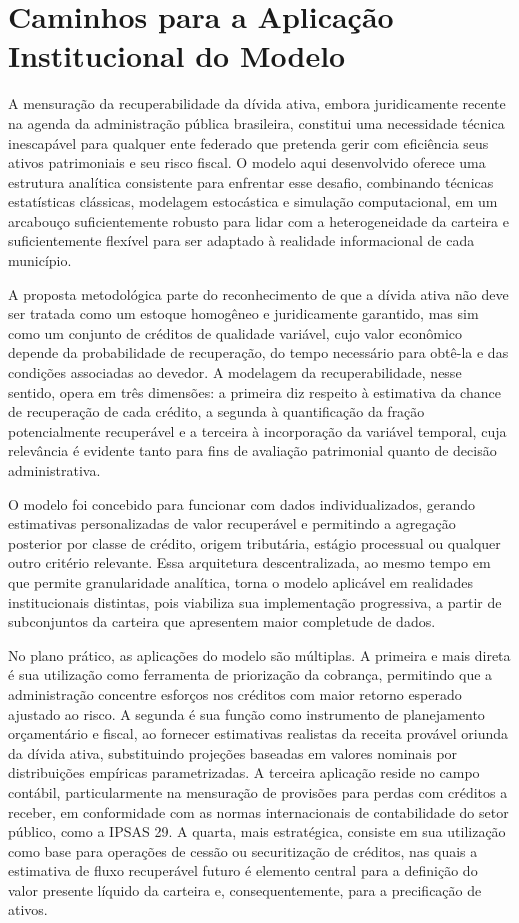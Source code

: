 \documentclass[a4paper,12pt]{article}
\begin{document}
\section{Caminhos para a Aplicação Institucional do Modelo}
A mensuração da recuperabilidade da dívida ativa, embora juridicamente recente na agenda da administração pública brasileira, constitui uma necessidade técnica inescapável para qualquer ente federado que pretenda gerir com eficiência seus ativos patrimoniais e seu risco fiscal. O modelo aqui desenvolvido oferece uma estrutura analítica consistente para enfrentar esse desafio, combinando técnicas estatísticas clássicas, modelagem estocástica e simulação computacional, em um arcabouço suficientemente robusto para lidar com a heterogeneidade da carteira e suficientemente flexível para ser adaptado à realidade informacional de cada município.

A proposta metodológica parte do reconhecimento de que a dívida ativa não deve ser tratada como um estoque homogêneo e juridicamente garantido, mas sim como um conjunto de créditos de qualidade variável, cujo valor econômico depende da probabilidade de recuperação, do tempo necessário para obtê-la e das condições associadas ao devedor. A modelagem da recuperabilidade, nesse sentido, opera em três dimensões: a primeira diz respeito à estimativa da chance de recuperação de cada crédito, a segunda à quantificação da fração potencialmente recuperável e a terceira à incorporação da variável temporal, cuja relevância é evidente tanto para fins de avaliação patrimonial quanto de decisão administrativa.

O modelo foi concebido para funcionar com dados individualizados, gerando estimativas personalizadas de valor recuperável e permitindo a agregação posterior por classe de crédito, origem tributária, estágio processual ou qualquer outro critério relevante. Essa arquitetura descentralizada, ao mesmo tempo em que permite granularidade analítica, torna o modelo aplicável em realidades institucionais distintas, pois viabiliza sua implementação progressiva, a partir de subconjuntos da carteira que apresentem maior completude de dados.

No plano prático, as aplicações do modelo são múltiplas. A primeira e mais direta é sua utilização como ferramenta de priorização da cobrança, permitindo que a administração concentre esforços nos créditos com maior retorno esperado ajustado ao risco. A segunda é sua função como instrumento de planejamento orçamentário e fiscal, ao fornecer estimativas realistas da receita provável oriunda da dívida ativa, substituindo projeções baseadas em valores nominais por distribuições empíricas parametrizadas. A terceira aplicação reside no campo contábil, particularmente na mensuração de provisões para perdas com créditos a receber, em conformidade com as normas internacionais de contabilidade do setor público, como a IPSAS 29. A quarta, mais estratégica, consiste em sua utilização como base para operações de cessão ou securitização de créditos, nas quais a estimativa de fluxo recuperável futuro é elemento central para a definição do valor presente líquido da carteira e, consequentemente, para a precificação de ativos.
\end{document}

